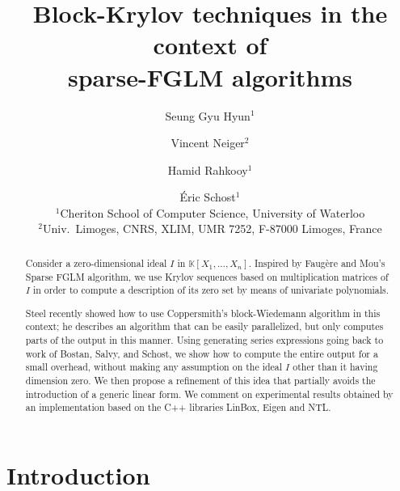 \documentclass[12pt]{article}
\title{Block-Krylov techniques in the context of \\ sparse-FGLM algorithms}
\author{Seung Gyu Hyun$^1$ \and Vincent Neiger$^2$ \and Hamid Rahkooy$^1$ \and \'Eric Schost$^1$\\[3mm]
$^1$Cheriton School of Computer Science, University of Waterloo\\[2mm]
$^2$Univ.~Limoges, CNRS, XLIM, UMR 7252, F-87000 Limoges, France
}
\def\K{\mathbb{K}}
\def\K {\ensuremath{\mathbb{K}}}
\begin{document}
\maketitle

\begin{abstract}
  Consider a zero-dimensional ideal $I$ in $\K[X_1,\dots,X_n]$.  Inspired by
  Faug\`ere and Mou's Sparse FGLM algorithm,
  we use Krylov sequences based on multiplication matrices of $I$ in order to
  compute a description of its zero set by means of univariate polynomials.

  Steel recently showed how to use Coppersmith's block-Wiedemann algorithm in
  this context; he describes an algorithm that can be easily parallelized, but
  only computes parts of the output in this manner. Using generating series
  expressions going back to work of Bostan, Salvy, and Schost, we show how to
  compute the entire output for a small overhead, without making any assumption
  on the ideal $I$ other than it having dimension zero. We then propose a refinement of this idea that partially
  avoids the introduction of a generic linear form.  We comment on experimental
  results obtained by an implementation based on the C++ libraries LinBox, Eigen and
  NTL.
\end{abstract}


\section{Introduction}
\end{document}
